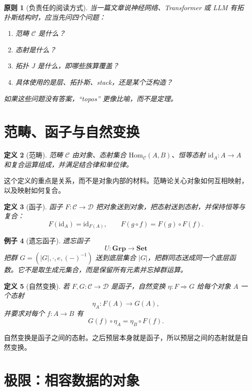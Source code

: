 \documentclass[UTF8,11pt,fontset=none]{ctexart}
\newtheorem{definition}{定义}[section]
\newtheorem{example}[definition]{例子}
\newtheorem{principle}[definition]{原则}
\newcommand{\Set}{\mathbf{Set}}
\newcommand{\Grp}{\mathbf{Grp}}
\newcommand{\Hom}{\mathrm{Hom}}
\newcommand{\id}{\mathrm{id}}
\begin{document}
\begin{principle}[负责任的阅读方式]
当一篇文章说神经网络、Transformer 或 LLM 有拓扑斯结构时，应当先问四个问题：
\begin{enumerate}
\item 范畴 \(\mathcal C\) 是什么？
\item 态射是什么？
\item 拓扑 \(J\) 是什么，即哪些族算覆盖？
\item 具体使用的是层、拓扑斯、stack，还是某个泛构造？
\end{enumerate}
如果这些问题没有答案，“topos” 更像比喻，而不是定理。
\end{principle}

\section{范畴、函子与自然变换}

\begin{definition}[范畴]
范畴 \(\mathcal C\) 由对象、态射集合 \(\Hom_{\mathcal C}(A,B)\)、恒等态射 \(\id_A:A\to A\) 和复合运算组成，并满足结合律和单位律。
\end{definition}

这个定义的重点是关系，而不是对象内部的材料。范畴论关心对象如何互相映射，以及映射如何复合。

\begin{definition}[函子]
函子 \(F:\mathcal C\to\mathcal D\) 把对象送到对象，把态射送到态射，并保持恒等与复合：
\[
F(\id_A)=\id_{F(A)},\qquad F(g\circ f)=F(g)\circ F(f).
\]
\end{definition}

\begin{example}[遗忘函子]
遗忘函子
\[
U:\Grp\longrightarrow \Set
\]
把群 \(G=(|G|,\cdot,e,(-)^{-1})\) 送到底层集合 \(|G|\)，把群同态送成同一个底层函数。它不是取生成元集合，而是保留所有元素并忘掉群运算。
\end{example}

\begin{definition}[自然变换]
若 \(F,G:\mathcal C\to\mathcal D\) 是函子，自然变换 \(\eta:F\Rightarrow G\) 给每个对象 \(A\) 一个态射
\[
\eta_A:F(A)\to G(A),
\]
并要求对每个 \(f:A\to B\) 有
\[
G(f)\circ \eta_A=\eta_B\circ F(f).
\]
\end{definition}

自然变换是函子之间的态射。之后预层本身就是函子，所以预层之间的态射就是自然变换。

\section{极限：相容数据的对象}
\end{document}
